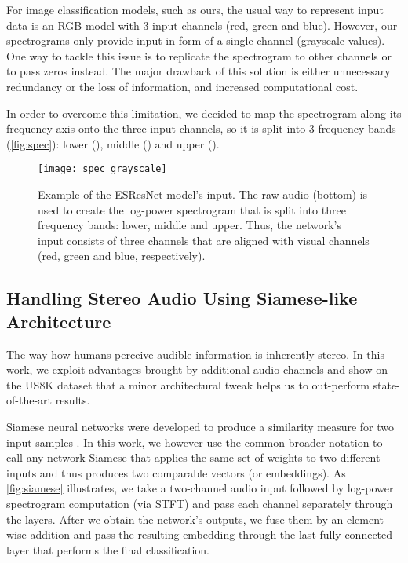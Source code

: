 \documentclass[a4paper,conference]{IEEEtran}
\begin{document}
For image classification models, such as ours, the usual way to represent input data is an RGB model with 3 input channels (red, green and blue).
However, our spectrograms only provide input in form of a single-channel (grayscale values).
One way to tackle this issue is to replicate the spectrogram to other channels or to pass zeros instead.
The major drawback of this solution is either unnecessary redundancy or the loss of information, and increased computational cost.

In order to overcome this limitation, we decided to map the spectrogram along its frequency axis onto the three input channels, so it is split into 3 frequency bands (\autoref{fig:spec}): lower (), middle () and upper ().

\begin{figure}[hbt]
\centering
\texttt{[image: spec\_grayscale]}
\caption{Example of the ESResNet model's input. The raw audio (bottom) is used to create the log-power spectrogram that is split into three frequency bands: lower, middle and upper. Thus, the network's input consists of three channels that are aligned with visual channels (red, green and blue, respectively).}
\label{fig:spec}
\end{figure}

\subsection{Handling Stereo Audio Using Siamese-like Architecture} \label{ssec:siamese}

The way how humans perceive audible information is inherently stereo.
In this work, we exploit advantages brought by additional audio channels and show on the US8K dataset that a minor architectural tweak helps us to out-perform \mbox{state-of-the-art} results.

Siamese neural networks were developed to produce a similarity measure for two input samples \cite{koch2015siamese}.
In this work, we however use the common broader notation to call any network Siamese that applies the same set of weights to two different inputs and thus produces two comparable vectors (or embeddings).
As \autoref{fig:siamese} illustrates, we take a two-channel audio input followed by log-power spectrogram computation (via STFT) and pass each channel separately through the layers.
After we obtain the network's outputs, we fuse them by an element-wise addition and pass the resulting embedding through the last fully-connected layer that performs the final classification.
\end{document}
